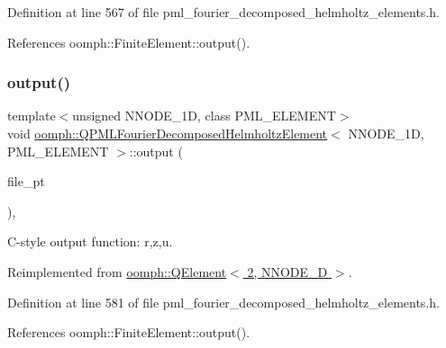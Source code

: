 Definition at line 567 of file pml\+\_\+fourier\+\_\+decomposed\+\_\+helmholtz\+\_\+elements.\+h.



References oomph\+::\+Finite\+Element\+::output().

\mbox{\label{classoomph_1_1QPMLFourierDecomposedHelmholtzElement_ade1081cf429f5dd7c90e83ef924f9bea}} 
\subsubsection{\texorpdfstring{output()}{output()}\hspace{0.1cm}{\footnotesize\ttfamily [3/4]}}
{\footnotesize\ttfamily template$<$unsigned N\+N\+O\+D\+E\+\_\+1D, class P\+M\+L\+\_\+\+E\+L\+E\+M\+E\+NT$>$ \\
void \hyperlink{classoomph_1_1QPMLFourierDecomposedHelmholtzElement}{oomph\+::\+Q\+P\+M\+L\+Fourier\+Decomposed\+Helmholtz\+Element}$<$ N\+N\+O\+D\+E\+\_\+1D, P\+M\+L\+\_\+\+E\+L\+E\+M\+E\+NT $>$\+::output (\begin{DoxyParamCaption}\item[{F\+I\+LE $\ast$}]{file\+\_\+pt }\end{DoxyParamCaption})\hspace{0.3cm}{\ttfamily [inline]}, {\ttfamily [virtual]}}



C-\/style output function\+: r,z,u. 



Reimplemented from \hyperlink{classoomph_1_1QElement_3_012_00_01NNODE__1D_01_4_a08e9ce84ba8787b25935f18c00996a5d}{oomph\+::\+Q\+Element$<$ 2, N\+N\+O\+D\+E\+\_\+D $>$}.



Definition at line 581 of file pml\+\_\+fourier\+\_\+decomposed\+\_\+helmholtz\+\_\+elements.\+h.



References oomph\+::\+Finite\+Element\+::output().

\mbox{\label{classoomph_1_1QPMLFourierDecomposedHelmholtzElement_ad0cc7d26df69a746a4b667ee447d4a7a}} 

